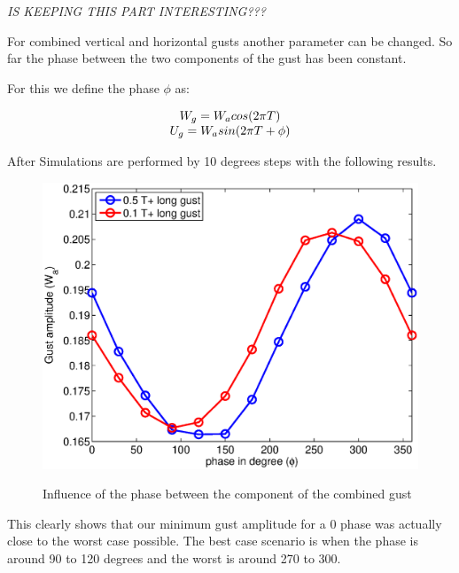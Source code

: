 \emph{IS KEEPING THIS PART INTERESTING???}


For combined vertical and horizontal gusts another parameter can be changed.
So far the phase between the two components of the gust has been constant.

\par For this we define the phase $\phi$ as:

\begin{equation}
  \begin{array}[c]{c}
    W_g=W_a cos(2\pi T) \\
    U_g=W_a sin(2\pi T + \phi)
  \end{array}
  \label{eqn:combined_gust_phase}
\end{equation}

After Simulations are performed by 10 degrees steps with the following results.

\begin{figure}[ht]
  \begin{center}
    \scalebox{0.8}
    {\includegraphics{./Figures/combined_gust_amplitude_vs_phase.eps}}
  \end{center}
  \caption{Influence of the phase between the component of the combined gust}
  \label{fig:combined_amplitude_phase}
\end{figure}

\par This clearly shows that our minimum gust amplitude for a 0 phase was actually close to the worst case possible.
The best case scenario is when the phase is around 90 to 120 degrees and the worst is around 270 to 300.


